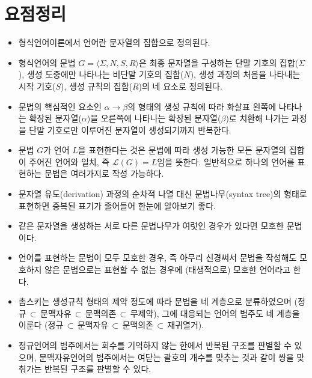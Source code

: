 \documentclass[b5paper,chapter,figtabcapt]{oblivoir}
\begin{document}
\section*{요점정리}
\begin{itemize}
    \item 형식언어이론에서 언어란 문자열의 집합으로 정의된다.
    \item 형식언어의 문법 $G=\langle\Sigma,N,S,R\rangle$은
    최종 문자열을 구성하는 단말 기호의 집합($\Sigma$),
    생성 도중에만 나타나는 비단말 기호의 집합($N$),
    생성 과정의 처음을 나타내는 시작 기호($S$),
    생성 규칙의 집합($R$)의 네 요소로 정의된다.
    \item 문법의 핵심적인 요소인 $\alpha\to\beta$의 형태의 생성 규칙에 따라
    화살표 왼쪽에 나타나는 확장된 문자열($\alpha$)을 오른쪽에 나타나는
    확장된 문자열($\beta$)로 치환해 나가는 과정을 단말 기호로만 이루어진
    문자열이 생성되기까지 반복한다.
    \item 문법 $G$가 언어 $L$을 표현한다는 것은 문법에 따라 생성 가능한 모든
    문자열의 집합이 주어진 언어와 일치, 즉 $\mathcal{L}(G) = L$임을 뜻한다.
    일반적으로 하나의 언어를 표현하는 문법은 여러가지로 작성 가능하다.
    \item 문자열 유도(derivation) 과정의 순차적 나열 대신
    문법나무(syntax tree)의 형태로 표현하면 중복된 표기가 줄어들어
    한눈에 알아보기 좋다.
    \item 같은 문자열을 생성하는 서로 다른 문법나무가 여럿인 경우가
    있다면 모호한 문법이다.
    \item 언어를 표현하는 문법이 모두 모호한 경우, 즉 아무리 신경써서
    문법을 작성해도 모호하지 않은 문법으로는 표현할 수 없는 경우에
    (태생적으로) 모호한 언어라고 한다.
    \item 촘스키는 생성규칙 형태의 제약 정도에 따라 문법을 네 계층으로 분류하였으며
    (정규$\,\subset\,$문맥자유$\,\subset\,$문맥의존$\,\subset\,$무제약),
    그에 대응되는 언어의 범주도 네 계층을 이룬다
    (정규$\,\subset\,$문맥자유$\,\subset\,$문맥의존$\,\subset\,$재귀열거).
    \item 정규언어의 범주에서는 회수를 기억하지 않는 한에서 반복된 구조를
    판별할 수 있으며, 문맥자유언어의 범주에서는 여닫는 괄호의 개수를 맞추는
    것과 같이 쌍을 맞춰가는 반복된 구조를 판별할 수 있다.
\end{itemize}
\end{document}
